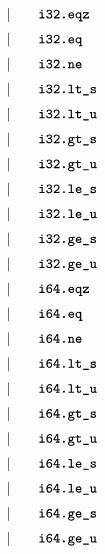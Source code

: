\begin{alignat*}{9}
    &&       &&\quad | &\quad && \textbf{\texttt{i32.eqz}} \quad &&  \\[1mm]
    &&       &&\quad | &\quad && \textbf{\texttt{i32.eq}} \quad &&  \\[1mm]
    &&       &&\quad | &\quad && \textbf{\texttt{i32.ne}} \quad &&  \\[1mm]
    &&       &&\quad | &\quad && \textbf{\texttt{i32.lt\textunderscore s}} \quad &&  \\[1mm]
    &&       &&\quad | &\quad && \textbf{\texttt{i32.lt\textunderscore u}} \quad &&  \\[1mm]
    &&       &&\quad | &\quad && \textbf{\texttt{i32.gt\textunderscore s}} \quad &&  \\[1mm]
    &&       &&\quad | &\quad && \textbf{\texttt{i32.gt\textunderscore u}} \quad &&  \\[1mm]
    &&       &&\quad | &\quad && \textbf{\texttt{i32.le\textunderscore s}} \quad &&  \\[1mm]
    &&       &&\quad | &\quad && \textbf{\texttt{i32.le\textunderscore u}} \quad &&  \\[1mm]
    &&       &&\quad | &\quad && \textbf{\texttt{i32.ge\textunderscore s}} \quad &&  \\[1mm]
    &&       &&\quad | &\quad && \textbf{\texttt{i32.ge\textunderscore u}} \quad &&  \\[1mm]
    &&       &&\quad | &\quad && \textbf{\texttt{i64.eqz}} \quad &&  \\[1mm]
    &&       &&\quad | &\quad && \textbf{\texttt{i64.eq}} \quad &&  \\[1mm]
    &&       &&\quad | &\quad && \textbf{\texttt{i64.ne}} \quad &&  \\[1mm]
    &&       &&\quad | &\quad && \textbf{\texttt{i64.lt\textunderscore s}} \quad &&  \\[1mm]
    &&       &&\quad | &\quad && \textbf{\texttt{i64.lt\textunderscore u}} \quad &&  \\[1mm]
    &&       &&\quad | &\quad && \textbf{\texttt{i64.gt\textunderscore s}} \quad &&  \\[1mm]
    &&       &&\quad | &\quad && \textbf{\texttt{i64.gt\textunderscore u}} \quad &&  \\[1mm]
    &&       &&\quad | &\quad && \textbf{\texttt{i64.le\textunderscore s}} \quad &&  \\[1mm]
    &&       &&\quad | &\quad && \textbf{\texttt{i64.le\textunderscore u}} \quad &&  \\[1mm]
    &&       &&\quad | &\quad && \textbf{\texttt{i64.ge\textunderscore s}} \quad &&  \\[1mm]
    &&       &&\quad | &\quad && \textbf{\texttt{i64.ge\textunderscore u}} \quad &&  \\[1mm]
\end{alignat*}

